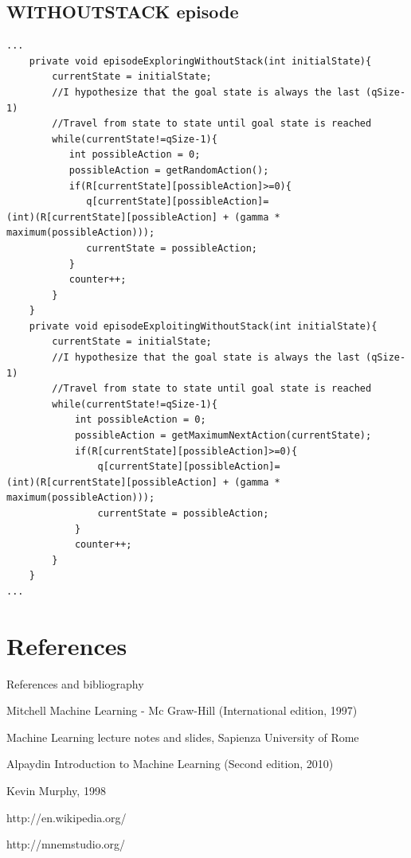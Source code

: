\documentclass[a4paper]{article}
\begin{document}
\subsection{WITHOUTSTACK episode}
\begin{verbatim}
...
    private void episodeExploringWithoutStack(int initialState){
        currentState = initialState;
        //I hypothesize that the goal state is always the last (qSize-1)
        //Travel from state to state until goal state is reached
        while(currentState!=qSize-1){
           int possibleAction = 0;
           possibleAction = getRandomAction();
           if(R[currentState][possibleAction]>=0){
              q[currentState][possibleAction]=
(int)(R[currentState][possibleAction] + (gamma * maximum(possibleAction)));
              currentState = possibleAction;
           }
           counter++;
        }  
    }  
    private void episodeExploitingWithoutStack(int initialState){
        currentState = initialState;
        //I hypothesize that the goal state is always the last (qSize-1)
        //Travel from state to state until goal state is reached
        while(currentState!=qSize-1){
            int possibleAction = 0;
            possibleAction = getMaximumNextAction(currentState);
            if(R[currentState][possibleAction]>=0){
                q[currentState][possibleAction]=
(int)(R[currentState][possibleAction] + (gamma * maximum(possibleAction)));
                currentState = possibleAction;
            }
            counter++;
        }  
    }
...

\end{verbatim}
\section{References}
References and bibliography
 
  Mitchell Machine Learning - Mc Graw-Hill (International edition, 1997)
 
  Machine Learning lecture notes and slides, Sapienza University of Rome
 
  Alpaydin Introduction to Machine Learning (Second edition, 2010)

  Kevin Murphy, 1998

  http://en.wikipedia.org/

  http://mnemstudio.org/
\end{document}
